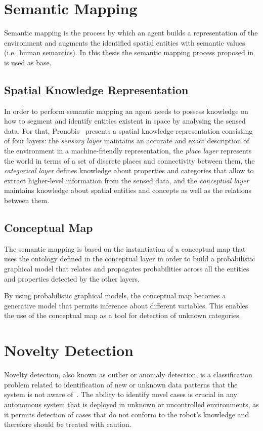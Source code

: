 \documentclass[9pt,a4paper]{extarticle}
\begin{document}
\begin{multicols}{2}
\section{Semantic Mapping}
Semantic mapping is the process by which an agent builds a representation of the environment and
augments the identified spatial entities with semantic values (i.e.\ human semantics).
In this thesis the semantic mapping process proposed in \cite{pronobis2011phd} is used as base.

\subsection{Spatial Knowledge Representation}
In order to perform semantic mapping an agent needs to possess knowledge on how to segment and
identify entities existent in space by analysing the sensed data. For that, 
Pronobis~\cite{pronobis2011semmap} presents a spatial knowledge representation consisting of four layers:
the \emph{sensory layer} maintains an accurate and exact description of the environment in a machine-friendly 
representation, the \emph{place layer} represents the world in terms of a set of discrete places and connectivity
between them, the \emph{categorical layer} defines knowledge about properties and categories that allow to extract
higher-level information from the sensed data, and the \emph{conceptual layer} maintains knowledge about 
spatial entities and concepts as well as the relations between them.

\subsection{Conceptual Map}
The semantic mapping is based on the instantiation of a conceptual map that uses the
ontology defined in the conceptual layer in order to build a probabilistic graphical model that
relates and propagates probabilities across all the entities and properties detected by the
other layers.

By using probabilistic graphical models, the conceptual map becomes a generative model that
permits inference about different variables. This enables the use of the conceptual map 
as a tool for detection of unknown categories.

\section{Novelty Detection}
Novelty detection, also known as outlier or anomaly detection, is a
classification problem related to identification of new or unknown data
patterns that the system is not aware of~\cite{markou2003novelty}.
The ability to identify novel cases is crucial in any autonomous system
that is deployed in unknown or uncontrolled environments, as it permits 
detection of cases that do not conform to the robot's knowledge and
therefore should be treated with caution.


\end{multicols}
\end{document}
